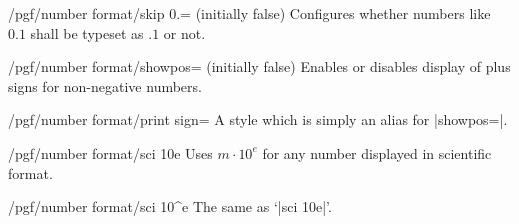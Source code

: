 \begin{key}{/pgf/number format/skip 0.= (initially false)}
	Configures whether numbers like $0.1$ shall be typeset as $.1$ or not.
\begin{codeexample}[]
\end{codeexample}
\begin{codeexample}[]
\end{codeexample}
\end{key}

\begin{key}{/pgf/number format/showpos= (initially false)}
	Enables or disables display of plus signs for non-negative numbers.
\begin{codeexample}[]
\end{codeexample}

\begin{codeexample}[]
\end{codeexample}

\begin{codeexample}[]
\end{codeexample}
\end{key}

\begin{stylekey}{/pgf/number format/print sign=}
	A style which is simply an alias for |showpos=|.
\end{stylekey}

\begin{key}{/pgf/number format/sci 10e}
Uses $m \cdot 10^e$ for any number displayed in scientific format.

\begin{codeexample}[]
\end{codeexample}
\end{key}

\begin{key}{/pgf/number format/sci 10\textasciicircum e}
The same as `|sci 10e|'.
\end{key}


